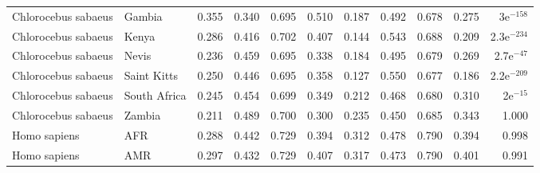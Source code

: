 \begin{longtable}{llrrrrrrrrr}
 Chlorocebus sabaeus &                    Gambia &                              0.355 &                               0.340 &                 0.695 &                 0.510 &                              0.187 &                               0.492 &                 0.678 &                 0.275 &   3e$^{-158}$ \\
 Chlorocebus sabaeus &                     Kenya &                              0.286 &                               0.416 &                 0.702 &                 0.407 &                              0.144 &                               0.543 &                 0.688 &                 0.209 & 2.3e$^{-234}$ \\
 Chlorocebus sabaeus &                     Nevis &                              0.236 &                               0.459 &                 0.695 &                 0.338 &                              0.184 &                               0.495 &                 0.679 &                 0.269 &  2.7e$^{-47}$ \\
 Chlorocebus sabaeus &               Saint Kitts &                              0.250 &                               0.446 &                 0.695 &                 0.358 &                              0.127 &                               0.550 &                 0.677 &                 0.186 & 2.2e$^{-209}$ \\
 Chlorocebus sabaeus &              South Africa &                              0.245 &                               0.454 &                 0.699 &                 0.349 &                              0.212 &                               0.468 &                 0.680 &                 0.310 &    2e$^{-15}$ \\
 Chlorocebus sabaeus &                    Zambia &                              0.211 &                               0.489 &                 0.700 &                 0.300 &                              0.235 &                               0.450 &                 0.685 &                 0.343 &         1.000 \\
        Homo sapiens &                       AFR &                              0.288 &                               0.442 &                 0.729 &                 0.394 &                              0.312 &                               0.478 &                 0.790 &                 0.394 &         0.998 \\
        Homo sapiens &                       AMR &                              0.297 &                               0.432 &                 0.729 &                 0.407 &                              0.317 &                               0.473 &                 0.790 &                 0.401 &         0.991 \\

\end{longtable}
